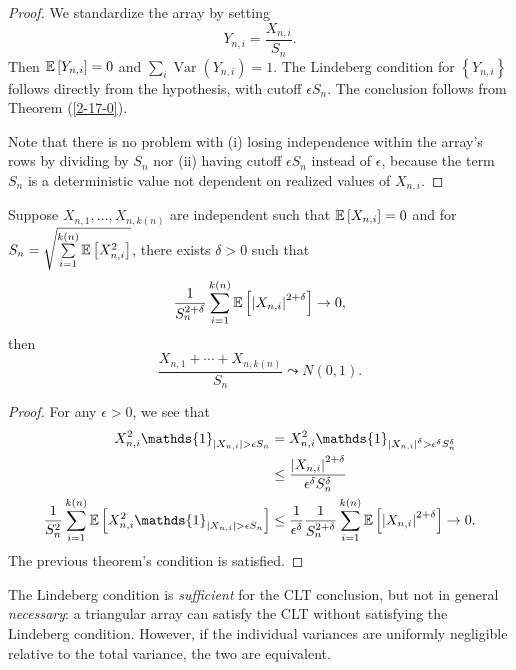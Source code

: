 \begin{proof}
	We standardize the array by setting
	\[
		Y_{n,i} = \frac{X_{n,i}}{S_n}.
	\]
	Then $\mathbb{E}\left[Y_{n,i}\right] = 0$ and $\sum_i \operatorname{Var}(Y_{n,i}) = 1$.
	The Lindeberg condition for $\left\{Y_{n,i}\right\}$ follows directly from the hypothesis, with cutoff $\epsilon S_n$.
	The conclusion follows from Theorem (\ref{2-17-0}).

	Note that there is no problem with (i) losing independence within the array's rows by dividing by $S_n$ nor (ii) having cutoff $\epsilon S_n$ instead of $\epsilon$, because the term $S_n$ is a deterministic value not dependent on realized values of $X_{n,i}$.
\end{proof}

\begin{theorem}
	Suppose $X_{n,1},\ldots,X_{n, k(n)}$ are independent such that $\mathbb{E}\left[X_{n,i}\right] =0$ and for $S_n = \sqrt{\sum\limits_{i=1}^{k(n)} \mathbb{E}\left[X_{n,i}^2\right] } $, there exists $\delta > 0$ such that \[
		\frac{1}{S_n^{2+\delta}} \sum\limits_{i=1}^{k(n)} \mathbb{E}\left[\left| X_{n,i} \right|^{2+\delta}\right] \to 0
	,\] 
	then \[
		\frac{X_{n,1} + \cdots + X_{n,k(n)}}{S_n}\leadsto N(0,1)
	.\] 
\end{theorem}
\begin{proof}
	For any $\epsilon > 0$, we see that
	\begin{align*}
		X_{n,i}^2 \mathds{1}_{\left| X_{n,i} \right|>\epsilon S_n}
		&= X_{n,i}^2 \mathds{1}_{\left| X_{n,i} \right|^\delta > \epsilon^\delta S_n^{\delta}} \\
		&\le \frac{\left| X_{n,i} \right|^{2+\delta}}{\epsilon^\delta S_n^{\delta}} \\
		\frac{1}{S_n^2} \sum\limits_{i=1}^{k(n)} \E\left[X_{n,i}^2 \mathds{1}_{\left| X_{n,i} \right| > \epsilon S_n}\right] 
		&\le \frac{1}{\epsilon^\delta} \frac{1}{S_n^{2+\delta}} \sum\limits_{i=1}^{k(n)} \E\left[\left| X_{n,i} \right|^{2+\delta}\right] \to 0
	.\end{align*}
	The previous theorem's condition is satisfied.
\end{proof}

\begin{remark}
	The Lindeberg condition is \emph{sufficient} for the CLT conclusion, but not in general \emph{necessary}: a triangular array can satisfy the CLT without satisfying the Lindeberg condition. However, if the individual variances are uniformly negligible relative to the total variance, the two are equivalent.
\end{remark}


